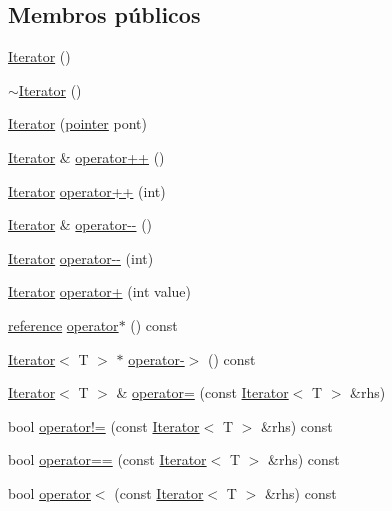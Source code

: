 \subsection*{Membros públicos}
\begin{DoxyCompactItemize}
\item 
\hyperlink{classIterator_a87d4af70ba6312e91e1ab6a7c9e2ec6d}{Iterator} ()
\item 
\hyperlink{classIterator_ae3ca5d592c9550743e6bfe07e5881c13}{$\sim$\+Iterator} ()
\item 
\hyperlink{classIterator_ab1fb88dce7c959a7d56537deb77ee717}{Iterator} (\hyperlink{classIterator_a37c4732ae0b73e9fdc3a585c01750d05}{pointer} pont)
\item 
\hyperlink{classIterator}{Iterator} \& \hyperlink{classIterator_aeb34c80997916ed2561271a7ed56014f}{operator++} ()
\item 
\hyperlink{classIterator}{Iterator} \hyperlink{classIterator_ae6099903beb02cae7feaac22c6cc1965}{operator++} (int)
\item 
\hyperlink{classIterator}{Iterator} \& \hyperlink{classIterator_aa158fc4216d0b532f8776cb1e9f8ac26}{operator-\/-\/} ()
\item 
\hyperlink{classIterator}{Iterator} \hyperlink{classIterator_a8ee6f51e0928e7acb530a2f5a262a13e}{operator-\/-\/} (int)
\item 
\hyperlink{classIterator}{Iterator} \hyperlink{classIterator_a2968564be6f00ffefcc3937219306faf}{operator+} (int value)
\item 
\hyperlink{classIterator_a104c7f213cd33d599aa25277176529d5}{reference} \hyperlink{classIterator_a337d71a2dce5d35218a5a5d92746cf4f}{operator$\ast$} () const
\item 
\hyperlink{classIterator}{Iterator}$<$ T $>$ $\ast$ \hyperlink{classIterator_adf83c8af24e2ef2a112963023a04b6a1}{operator-\/$>$} () const
\item 
\hyperlink{classIterator}{Iterator}$<$ T $>$ \& \hyperlink{classIterator_ada84e69bbc46c63419f81b57b613ccd3}{operator=} (const \hyperlink{classIterator}{Iterator}$<$ T $>$ \&rhs)
\item 
bool \hyperlink{classIterator_a32c6a5534138f799579a06a39a70f456}{operator!=} (const \hyperlink{classIterator}{Iterator}$<$ T $>$ \&rhs) const
\item 
bool \hyperlink{classIterator_aff009192cf339f15c98018879d1ddba5}{operator==} (const \hyperlink{classIterator}{Iterator}$<$ T $>$ \&rhs) const
\item 
bool \hyperlink{classIterator_ad39301c065fa58593a3d89155f1b8587}{operator$<$} (const \hyperlink{classIterator}{Iterator}$<$ T $>$ \&rhs) const
\end{DoxyCompactItemize}
